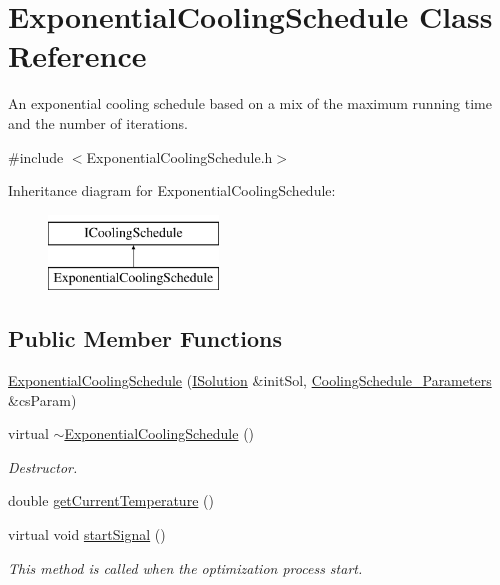 \hypertarget{classExponentialCoolingSchedule}{\section{\-Exponential\-Cooling\-Schedule \-Class \-Reference}
\label{classExponentialCoolingSchedule}
}


\-An exponential cooling schedule based on a mix of the maximum running time and the number of iterations.  




{\ttfamily \#include $<$\-Exponential\-Cooling\-Schedule.\-h$>$}

\-Inheritance diagram for \-Exponential\-Cooling\-Schedule\-:\begin{figure}[H]
\begin{center}
\leavevmode
\includegraphics[height=2.000000cm]{classExponentialCoolingSchedule}
\end{center}
\end{figure}
\subsection*{\-Public \-Member \-Functions}
\begin{DoxyCompactItemize}
\item 
\hyperlink{classExponentialCoolingSchedule_a41341124cd5cac5e92bf90d78d967462}{\-Exponential\-Cooling\-Schedule} (\hyperlink{classISolution}{\-I\-Solution} \&init\-Sol, \hyperlink{classCoolingSchedule__Parameters}{\-Cooling\-Schedule\-\_\-\-Parameters} \&cs\-Param)
\item 
\hypertarget{classExponentialCoolingSchedule_a28ec19b3dd2a2da22132027de5119d5f}{virtual \hyperlink{classExponentialCoolingSchedule_a28ec19b3dd2a2da22132027de5119d5f}{$\sim$\-Exponential\-Cooling\-Schedule} ()}\label{classExponentialCoolingSchedule_a28ec19b3dd2a2da22132027de5119d5f}

\begin{DoxyCompactList}\small\item\em \-Destructor. \end{DoxyCompactList}\item 
double \hyperlink{classExponentialCoolingSchedule_ac32efff552a53ff64ff00deb490b1cb7}{get\-Current\-Temperature} ()
\item 
\hypertarget{classExponentialCoolingSchedule_a64b6a3c4b329b18ca55c68d75cb03a00}{virtual void \hyperlink{classExponentialCoolingSchedule_a64b6a3c4b329b18ca55c68d75cb03a00}{start\-Signal} ()}\label{classExponentialCoolingSchedule_a64b6a3c4b329b18ca55c68d75cb03a00}

\begin{DoxyCompactList}\small\item\em \-This method is called when the optimization process start. \end{DoxyCompactList}\end{DoxyCompactItemize}


